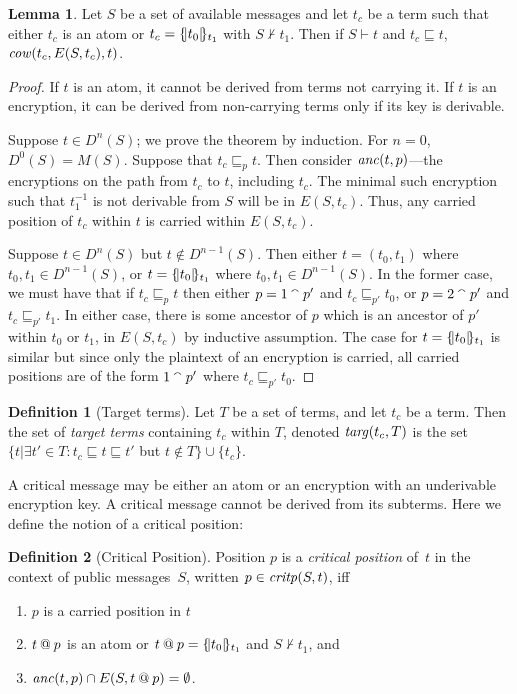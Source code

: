 \documentclass[12pt]{article}
\theoremstyle{definition}
\newtheorem{defn}{Definition}[section]
\newtheorem{lem}{Lemma}[section]
\newcommand{\critpos}{\fn{critp}}
\newcommand{\anc}{\fn{anc}}
\newcommand{\mcow}{\fn{cow}}
\begin{document}
\begin{lem}
\label{lem:escapeset}
Let $S$ be a set of available messages and let $t_c$ be a term such that either $t_c$ is an atom
or $t_c = \{\!|t_0|\!\}_{t_1}$ with $S \not\vdash t_1$.  Then if $S \vdash t$ and $t_c \sqsubseteq t$,
$\mcow(t_c,E(S,t_c),t)$.
\end{lem}

\begin{proof}
If $t$ is an atom, it cannot be derived from terms not carrying it.
If $t$ is an encryption, it can be derived from non-carrying terms
only if its key is derivable.

Suppose $t \in D^n(S)$; we prove the theorem by induction.  For $n =
0$, $D^0(S) = M(S)$.  Suppose that $t_c \sqsubseteq_p t$.  Then
consider $\anc(t,p)$---the
encryptions on the path from $t_c$ to $t$, including $t_c$.  The
minimal such encryption such that $t_1^{-1}$ is not derivable from $S$
will be in $E(S,t_c)$.  Thus, any carried position of $t_c$ within $t$
is carried within $E(S,t_c)$.

Suppose $t \in D^n(S)$ but $t \notin D^{n-1}(S)$.  Then either $t =
(t_0, t_1)$ where $t_0, t_1 \in D^{n-1}(S)$, or $t = \{\!|t_0|\!\}_{t_1}$
where $t_0, t_1 \in D^{n-1}(S)$.  In the former case, we must have
that if $t_c \sqsubseteq_p t$ then either $p = 1 \mathbin{{}^\smallfrown} p'$ and $t_c
\sqsubseteq_{p'} t_0$, or $p = 2 \mathbin{{}^\smallfrown} p'$ and $t_c \sqsubseteq_{p'}
t_1$.  In either case, there is some ancestor of $p$ which is an
ancestor of $p'$ within $t_0$ or $t_1$, in $E(S,t_c)$ by inductive
assumption.  The case for $t = \{\!|t_0|\!\}_{t_1}$ is similar but since
only the plaintext of an encryption is carried, all carried positions
are of the form $1 \mathbin{{}^\smallfrown} p'$ where $t_c \sqsubseteq_{p'} t_0$.
\end{proof}

\begin{defn}[Target terms]
Let $T$ be a set of terms, and let $t_c$ be a term.  Then the
set of {\em target terms} containing $t_c$ within $T$, denoted
$\operatorname{\mathit{targ}}(t_c,T)$ is the set
$\{t | \exists t' \in T: t_c \sqsubseteq t \sqsubseteq t'$ but $t \notin T\} \cup \{t_c\}$.  
\end{defn}

A critical message may be either an atom or an encryption with an
underivable encryption key.  A critical message cannot be derived from
its subterms.  Here we define the notion of a critical position:

\begin{defn}[Critical Position]
Position $p$ is a \emph{critical position} of~$t$ in the context of
public messages~$S$, written $p\in\critpos(S,t)$, iff
\begin{enumerate}
\item $p$ is a carried position in $t$
\item $t \mathbin{@} p$ is an atom or $t \mathbin{@} p = \{\!|t_0|\!\}_{t_1}$ and $S \not\vdash t_1$, and
\item $\anc(t,p) \cap E(S,t \termat p) = \emptyset$.
\end{enumerate} \end{defn}
\end{document}
